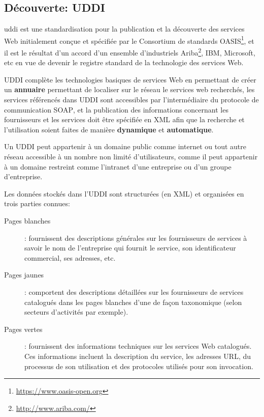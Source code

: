   \subsection{Découverte: UDDI}
  \label{sec:uddi}
  \acrshort{uddi} \cite{clement2004uddi} est une standardisation pour
  la publication et la découverte des services Web initialement conçue
  et spécifiée par le Consortium de standards
  OASIS\footnote{\url{https://www.oasis-open.org}}, et il est le
  résultat d'un accord d'un ensemble d’industriels
  Ariba\footnote{\url{http://www.ariba.com/}}, IBM, Microsoft, etc en
  vue de devenir le registre standard de la technologie des services
  Web.

  \textsc{UDDI} complète les technologies basiques de services Web en
  permettant de créer un \textbf{annuaire} permettant de localiser sur
  le réseau le services web recherchés, les services référencés dans
  \textsc{UDDI} sont accessibles par l'intermédiaire du protocole de
  communication \textsc{SOAP}, et la publication des informations
  concernant les fournisseurs et les services doit être spécifiée en
  \textsc{XML} afin que la recherche et l'utilisation soient faites de
  manière \textbf{dynamique} et \textbf{automatique}.

  Un \textsc{UDDI} peut appartenir à un domaine public comme internet
  ou tout autre réseau accessible à un nombre non limité
  d'utilisateurs, comme il peut appartenir à un domaine restreint
  comme l'intranet d’une entreprise ou d'un groupe d'entreprise.

  Les données stockés dans l'UDDI sont structurées (en \textsc{XML})
  et organisées en trois parties connues:

  \SpecialItem
  \begin{description}
    \item[Pages blanches]: fournissent des descriptions générales sur
      les fournisseurs de services à savoir le nom de l'entreprise qui
      fournit le service, son identificateur commercial, ses adresses,
      etc.
        
    \item[Pages jaunes]: comportent des descriptions détaillées sur
      les fournisseurs de services catalogués dans les pages blanches
      d'une de façon taxonomique (selon secteurs d'activités par
      exemple).

    \item[Pages vertes]: fournissent des informations techniques sur
      les services Web catalogués. Ces informations incluent la
      description du service, les adresses \textsc{URL}, du processus
      de son utilisation et des protocoles utilisés pour son
      invocation.
        

  \end{description}

